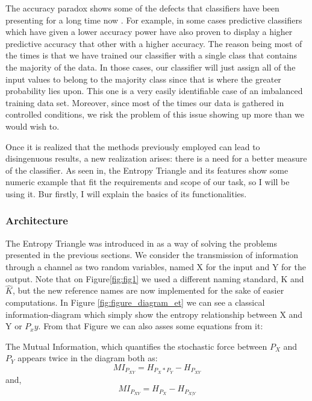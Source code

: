 The accuracy paradox shows some of the defects that classifiers have been presenting for a long time now . For example, in some cases predictive classifiers which have given a lower accuracy power have also proven to display a higher predictive accuracy that other with a higher accuracy. The reason being most of the times is that we have trained our classifier with a single class that contains the majority of the data. In those cases, our classifier will just assign all of the input values to belong to the majority class since that is where the greater probability lies upon. This one is a very easily identifiable case of an imbalanced training data set. Moreover, since most of the times our data is gathered in controlled conditions, we risk the problem of this issue showing up more than we would wish to.\par

Once it is realized that the methods previously employed can lead to disingenuous results, a new realization arises: there is a need for a better measure of the classifier. As seen in, the Entropy Triangle and its features show some numeric example that fit the requirements and scope of our task, so I will be using it. Bur firstly, I will explain the basics of its functionalities.\par

\subsubsection{Architecture}

The Entropy Triangle was introduced in \cite{val:pel:10b} as a way of solving the problems presented in the previous sections. We consider the transmission of information through a channel as two random variables, named X for the input and Y for the output. Note that on Figure\ref{fig:fig1} we used a different naming standard, K and $\hat{K}$, but the new reference names are now implemented for the sake of easier computations. In Figure \ref{fig:figure_diagram_et} we can see a classical information-diagram which simply show the entropy relationship between X and Y or $P_xy$. From that Figure we can also asses some equations from it:\par

The Mutual Information, which quantifies the stochastic force between $P_X$ and $P_Y$ appears twice in the diagram both as:
\begin{equation}\label{eq:mutual_information_1}
MI_{P_{XY}} = H_{P_X * P_Y} - H_{P_{XY}}
\end{equation}
and,
\begin{equation}\label{eq:mutual_information_2}
MI_{P_{XY}} = H_{P_X} - H_{P_{X|Y}}
\end{equation}

